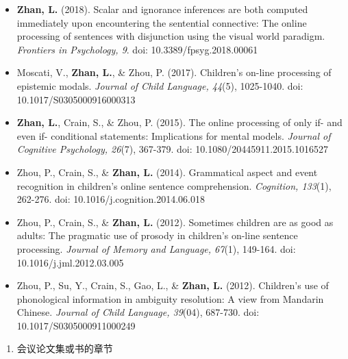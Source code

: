 \documentclass[
  12pt,
]{article}
\providecommand{\tightlist}{%
  \setlength{\itemsep}{0pt}\setlength{\parskip}{0pt}}
\begin{document}
\begin{itemize}
{  \faFilePdf[regular] }
\item
  \textbf{Zhan, L.} (2018). Scalar and ignorance inferences are both
  computed immediately upon encountering the sentential connective: The
  online processing of sentences with disjunction using the visual world
  paradigm. \emph{Frontiers in Psychology, 9}. doi:
  10.3389/fpsyg.2018.00061
  \href{https://www.frontiersin.org/articles/10.3389/fpsyg.2018.00061/full}{
  \faFilePdf[regular] }
\item
  Moscati, V., \textbf{Zhan, L.}, \& Zhou, P. (2017). Children's on-line
  processing of epistemic modals. \emph{Journal of Child Language,
  44}(5), 1025-1040. doi: 10.1017/S0305000916000313
  \href{https://publications.likan.info/Periodicals/JChildLang2016.pdf}{
  \faFilePdf[regular] }
\item
  \textbf{Zhan, L.}, Crain, S., \& Zhou, P. (2015). The online
  processing of only if- and even if- conditional statements:
  Implications for mental models. \emph{Journal of Cognitive Psychology,
  26}(7), 367-379. doi: 10.1080/20445911.2015.1016527
  \href{https://publications.likan.info/Periodicals/JCognPsychol2015.pdf}{
  \faFilePdf[regular] }
\item
  Zhou, P., Crain, S., \& \textbf{Zhan, L.} (2014). Grammatical aspect
  and event recognition in children's online sentence comprehension.
  \emph{Cognition, 133}(1), 262-276. doi:
  10.1016/j.cognition.2014.06.018
  \href{http://publications.likan.info/Periodicals/Cognition2014.pdf}{
  \faFilePdf[regular] }
\item
  Zhou, P., Crain, S., \& \textbf{Zhan, L.} (2012). Sometimes children
  are as good as adults: The pragmatic use of prosody in children's
  on-line sentence processing. \emph{Journal of Memory and Language,
  67}(1), 149-164. doi: 10.1016/j.jml.2012.03.005
  \href{https://publications.likan.info/Periodicals/JMemLang2012.pdf}{
  \faFilePdf[regular] }
\item
  Zhou, P., Su, Y., Crain, S., Gao, L., \& \textbf{Zhan, L.} (2012).
  Children's use of phonological information in ambiguity resolution: A
  view from Mandarin Chinese. \emph{Journal of Child Language, 39}(04),
  687-730. doi: 10.1017/S0305000911000249
  \href{https://publications.likan.info/Periodicals/JChildLang2012.pdf}{
  \faFilePdf[regular] }
\end{itemize}

\begin{enumerate}
\def\labelenumi{\arabic{enumi}.}
\setcounter{enumi}{2}
\tightlist
\item
  会议论文集或书的章节
\end{enumerate}
\end{document}

